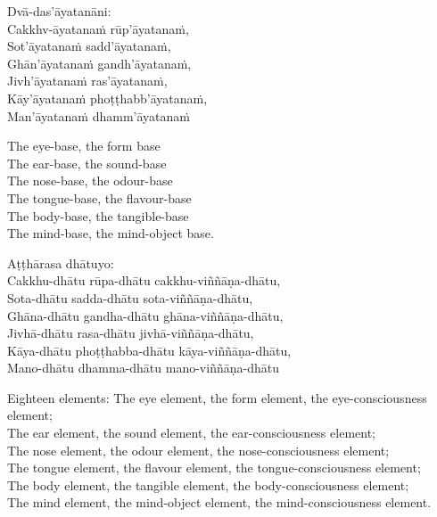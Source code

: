 \suttaRef{[MN 109]}

Dvā-das'āyatanāni:\\
Cakkhv-āyatanaṁ rūp'āyatanaṁ,\\
Sot'āyatanaṁ sadd'āyatanaṁ,\\
Ghān'āyatanaṁ gandh'āyatanaṁ,\\
Jivh'āyatanaṁ ras'āyatanaṁ,\\
Kāy'āyatanaṁ phoṭṭhabb'āyatanaṁ,\\
Man'āyatanaṁ dhamm'āyatanaṁ

\begin{english}
  The eye-base, the form base\\
  The ear-base, the sound-base\\
  The nose-base, the odour-base\\
  The tongue-base, the flavour-base\\
  The body-base, the tangible-base\\
  The mind-base, the mind-object base.
\end{english}

\suttaRef{[MN 148]}

Aṭṭhārasa dhātuyo:\\
Cakkhu-dhātu rūpa-dhātu cakkhu-viññāṇa-dhātu,\\
Sota-dhātu sadda-dhātu sota-viññāṇa-dhātu,\\
Ghāna-dhātu gandha-dhātu ghāna-viññāṇa-dhātu,\\
Jivhā-dhātu rasa-dhātu jivhā-viññāṇa-dhātu,\\
Kāya-dhātu phoṭṭhabba-dhātu kāya-viññāṇa-dhātu,\\
Mano-dhātu dhamma-dhātu mano-viññāṇa-dhātu

\begin{english}
  Eighteen elements: The eye element, the form element, the eye-consciousness\\
  element;\\
  The ear element, the sound element, the ear-consciousness element;\\
  The nose element, the odour element, the nose-consciousness element;\\
  The tongue element, the flavour element, the tongue-consciousness element;\\
  The body element, the tangible element, the body-consciousness element;\\
  The mind element, the mind-object element, the mind-consciousness element.
\end{english}

